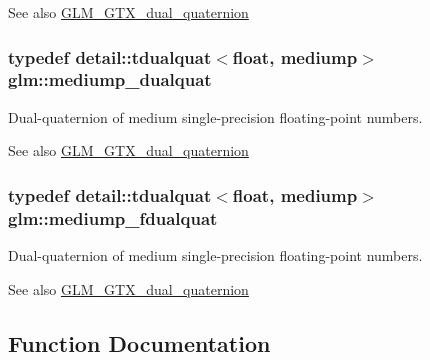 \begin{DoxySeeAlso}{See also}
\hyperlink{group__gtc__dual__quaternion}{G\+L\+M\+\_\+\+G\+T\+X\+\_\+dual\+\_\+quaternion} 
\end{DoxySeeAlso}
\subsubsection[{\texorpdfstring{mediump\+\_\+dualquat}{mediump_dualquat}}]{\setlength{\rightskip}{0pt plus 5cm}typedef detail\+::tdualquat$<$float, mediump$>$ {\bf glm\+::mediump\+\_\+dualquat}}\hypertarget{group__gtc__dual__quaternion_ga71fc1c10a382330c1fee55ce29703405}{}\label{group__gtc__dual__quaternion_ga71fc1c10a382330c1fee55ce29703405}
Dual-\/quaternion of medium single-\/precision floating-\/point numbers.

\begin{DoxySeeAlso}{See also}
\hyperlink{group__gtc__dual__quaternion}{G\+L\+M\+\_\+\+G\+T\+X\+\_\+dual\+\_\+quaternion} 
\end{DoxySeeAlso}
\subsubsection[{\texorpdfstring{mediump\+\_\+fdualquat}{mediump_fdualquat}}]{\setlength{\rightskip}{0pt plus 5cm}typedef detail\+::tdualquat$<$float, mediump$>$ {\bf glm\+::mediump\+\_\+fdualquat}}\hypertarget{group__gtc__dual__quaternion_gab211d24786158490e57dfa57d7744f71}{}\label{group__gtc__dual__quaternion_gab211d24786158490e57dfa57d7744f71}
Dual-\/quaternion of medium single-\/precision floating-\/point numbers.

\begin{DoxySeeAlso}{See also}
\hyperlink{group__gtc__dual__quaternion}{G\+L\+M\+\_\+\+G\+T\+X\+\_\+dual\+\_\+quaternion} 
\end{DoxySeeAlso}


\subsection{Function Documentation}
